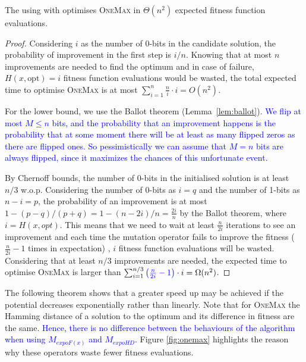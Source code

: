 \documentclass[lettersize,journal]{IEEEtran}
\newcommand{\new}[1]{\textcolor{blue}{#1}}
\begin{document}
\begin{theorem} \label{th:linHD-OM}
The {\oneoneIA } using \IPHfcm{} with {\linHD } optimises \textsc{OneMax} in $\Theta(n^2)$ expected fitness function evaluations.
\end{theorem}

\begin{proof}
Considering $i$ as the number of 0-bits in the candidate solution, the probability of improvement in the first step is $i/n$. Knowing that at most $n$ improvements are needed to find the optimum and in case of failure, $H(x,\text{opt})=i$ fitness function evaluations would be wasted, the total expected time to optimise \textsc{OneMax} is at most $\sum_{i=1}^n \frac{n}{i} \cdot i =O(n^2)$.

For the lower bound, we use the Ballot theorem (Lemma~\ref{lem:ballot}). 
\new{We flip at most $M \le n$ bits, and the probability that an improvement happens is the probability that at some moment there will be at least as many flipped zeros as there are flipped ones. So pessimistically we can assume that  $M = n$ bits are always flipped, since it maximizes the chances of this unfortunate event.} 

By Chernoff bounds, the number of 0-bits in the initialised solution is at least $n/3$ w.o.p. Considering the number of 
0-bits as $i=q$ and the number of 1-bits as $n-i=p$, the probability of 
an improvement is at most $1-(p-q)/(p+q)=1-(n-2i)/n=\frac{2i}{n}$ by the Ballot theorem, where $i=H(x, opt)$. This means that we need to wait at least $\frac{n}{2i}$ iterations to see an improvement and each time the mutation operator fails to improve the fitness {(\color{blue}$\frac{n}{2i} - 1$ times in expectation) }, $i$ fitness function evaluations will be wasted. Considering that at least $n/3$ improvements are needed, the expected time to optimise \textsc{OneMax} is larger than $\sum_{i=1}^{n/3} {\color{blue}\left(\frac{n}{2i}-1\right)} \cdot i= \Omega(n^2)$.
\end{proof}

The following theorem shows that a greater speed up may be achieved if the potential decreases exponentially rather than linearly. Note that for \textsc{OneMax} the Hamming distance of a solution to the optimum and its difference in fitness are the same. %
\new{Hence, there is no difference between the behaviours of the algorithm when using $M_{expoF(x)}$ and $M_{expoHD}$.} 
Figure \ref{fig:onemax} highlights the reason why these operators waste fewer fitness evaluations.
\end{document}
